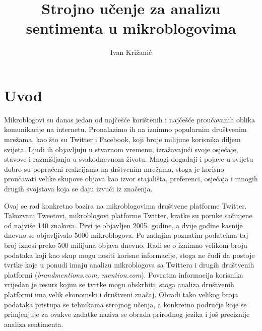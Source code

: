 \documentclass[times, utf8, zavrsni]{fer}
\begin{document}

\title{Strojno učenje za analizu sentimenta u mikroblogovima}

\author{Ivan Križanić}

\maketitle

\izvornik

\zahvala{}

\tableofcontents

\chapter{Uvod}
 
Mikroblogovi su danas jedan od najčešće korištenih i najčešće proučavanih oblika komunikacije na internetu. Pronalazimo ih na iznimno popularnim društvenim mrežama, kao što su Twitter i Facebook, koji broje milijune korisnika diljem svijeta. Ljudi ih objavljuju u stvarnom vremenu, izražavajući svoje osjećaje, stavove i razmišljanja u svakodnevnom životu. Mnogi događaji i pojave u svijetu dobro su popraćeni reakcijama na drštvenim mrežama, stoga je korisno proučavati velike skupove objava kao izvor stajališta, preferenci, osjećaja i mnogih drugih svojstava koja se daju izvući iz značenja. 

Ovaj se rad konkretno bazira na mikroblogovima društvene platforme Twitter. Takozvani Tweetovi, mikroblogovi platforme Twitter, kratke su poruke sačinjene od najviše 140 znakova. Prvi je objavljen 2005. godine, a dvije godine kasnije dnevno se objavljivalo 5000 mikroblogova. Po zadnjim poznatim podatcima taj broj iznosi preko 500 milijuna objava dnevno.\citep{twitterStats} Radi se o iznimno velikom broju podataka koji kao skup mogu nositi korisne informacije, stoga ne čudi da postoje tvrtke koje u ponudi imaju analizu mikroblogova sa Twittera i drugih društvenih platformi (\textit{brandmentions.com, mention.com}). Povratna informacija korisnika vrijedan je resurs kojim se tvrtke mogu obskrbiti, stoga analiza društvenih platformi ima velik ekonomski i društveni značaj. Obradi tako velikog broja podataka pristupa se tehnikama strojnog učenja, a konkretno područje koje se primjenjuje za ovakve zadatke naziva se obrada prirodnog jezika i još preciznije analiza sentimenta. 
\end{document}
